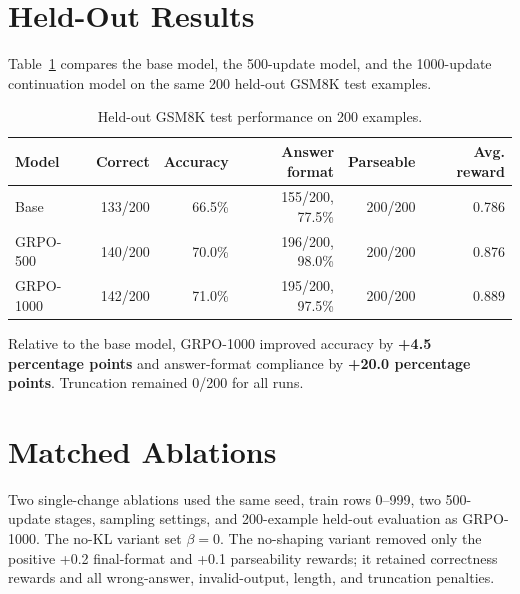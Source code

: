 \documentclass[11pt]{article}
\begin{document}
\section{Held-Out Results}

Table~\ref{tab:eval} compares the base model, the 500-update model, and the 1000-update continuation model on the same 200 held-out GSM8K test examples.

\begin{table}[h]
\centering
\caption{Held-out GSM8K test performance on 200 examples.}
\label{tab:eval}
\begin{tabular}{lrrrrr}
\toprule
Model & Correct & Accuracy & Answer format & Parseable & Avg. reward \\
\midrule
Base & 133/200 & 66.5\% & 155/200, 77.5\% & 200/200 & 0.786 \\
GRPO-500 & 140/200 & 70.0\% & 196/200, 98.0\% & 200/200 & 0.876 \\
GRPO-1000 & 142/200 & 71.0\% & 195/200, 97.5\% & 200/200 & 0.889 \\
\bottomrule
\end{tabular}
\end{table}

Relative to the base model, GRPO-1000 improved accuracy by \textbf{+4.5 percentage points} and answer-format compliance by \textbf{+20.0 percentage points}. Truncation remained 0/200 for all runs.

\section{Matched Ablations}

Two single-change ablations used the same seed, train rows 0--999, two 500-update stages, sampling settings, and 200-example held-out evaluation as GRPO-1000. The no-KL variant set \(\beta=0\). The no-shaping variant removed only the positive +0.2 final-format and +0.1 parseability rewards; it retained correctness rewards and all wrong-answer, invalid-output, length, and truncation penalties.

\begin{table}[h]
\centering
\caption{Matched ablations on the same 200 held-out GSM8K examples.}
\label{tab:ablations}
\end{table}
\end{document}
